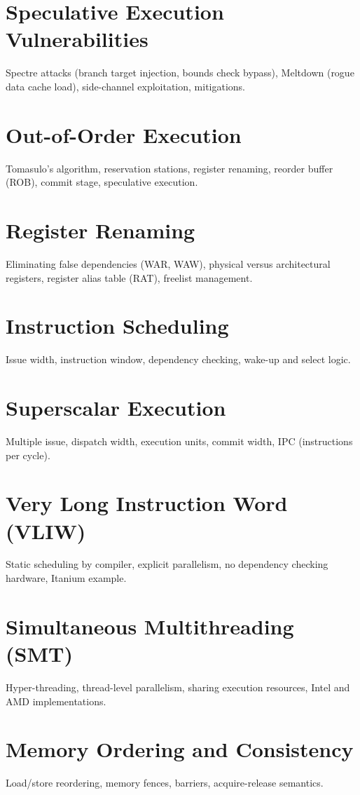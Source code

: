 \chapter{Speculative Execution Vulnerabilities}
Spectre attacks (branch target injection, bounds check bypass), Meltdown (rogue data cache load), side-channel exploitation, mitigations.

\chapter{Out-of-Order Execution}
Tomasulo's algorithm, reservation stations, register renaming, reorder buffer (ROB), commit stage, speculative execution.

\chapter{Register Renaming}
Eliminating false dependencies (WAR, WAW), physical versus architectural registers, register alias table (RAT), freelist management.

\chapter{Instruction Scheduling}
Issue width, instruction window, dependency checking, wake-up and select logic.

\chapter{Superscalar Execution}
Multiple issue, dispatch width, execution units, commit width, IPC (instructions per cycle).

\chapter{Very Long Instruction Word (VLIW)}
Static scheduling by compiler, explicit parallelism, no dependency checking hardware, Itanium example.

\chapter{Simultaneous Multithreading (SMT)}
Hyper-threading, thread-level parallelism, sharing execution resources, Intel and AMD implementations.

\chapter{Memory Ordering and Consistency}
Load/store reordering, memory fences, barriers, acquire-release semantics.

